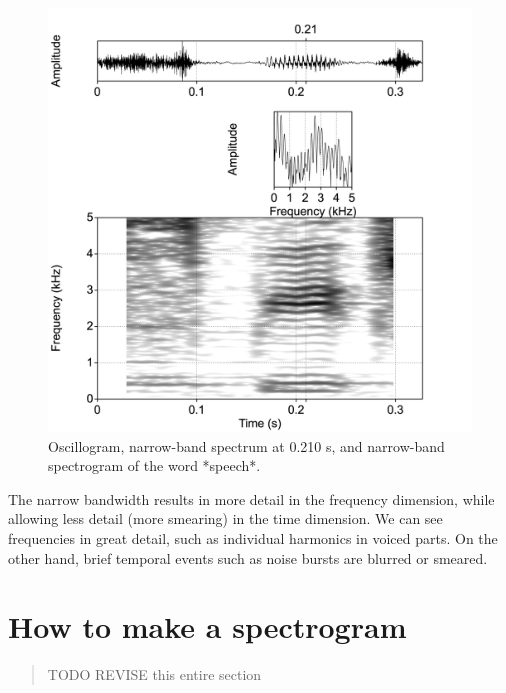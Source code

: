 \documentclass[
]{book}
\begin{document}
\begin{figure}

{\centering \includegraphics{figures/speech_word_spectrogram_30ms} 

}

\caption{Oscillogram, narrow-band spectrum at 0.210 s, and narrow-band spectrogram of the word *speech*.}\label{fig:speech-word-spectrogram-narrow}
\end{figure}

The narrow bandwidth results in more detail in the frequency dimension, while allowing less detail (more smearing) in the time dimension. We can see frequencies in great detail, such as individual harmonics in voiced parts. On the other hand, brief temporal events such as noise bursts are blurred or smeared.

\section{How to make a spectrogram}\label{how-to-make-a-spectrogram}

\begin{quote}
TODO REVISE this entire section
\end{quote}
\end{document}
